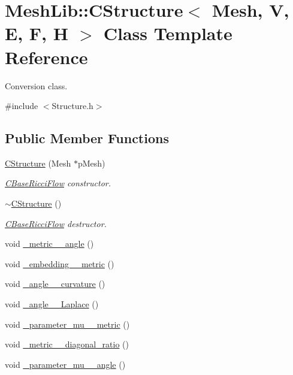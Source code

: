\hypertarget{class_mesh_lib_1_1_c_structure}{}\section{Mesh\+Lib\+:\+:C\+Structure$<$ Mesh, V, E, F, H $>$ Class Template Reference}
\label{class_mesh_lib_1_1_c_structure}


Conversion class.  




{\ttfamily \#include $<$Structure.\+h$>$}

\subsection*{Public Member Functions}
\begin{DoxyCompactItemize}
\item 
\hyperlink{class_mesh_lib_1_1_c_structure_a368f9061a7c92f3b85b9f59348b7f651}{C\+Structure} (Mesh $\ast$p\+Mesh)
\begin{DoxyCompactList}\small\item\em \hyperlink{class_mesh_lib_1_1_c_base_ricci_flow}{C\+Base\+Ricci\+Flow} constructor. \end{DoxyCompactList}\item 
\hyperlink{class_mesh_lib_1_1_c_structure_aef09abc61c919cf9c010497b6bad37cd}{$\sim$\+C\+Structure} ()
\begin{DoxyCompactList}\small\item\em \hyperlink{class_mesh_lib_1_1_c_base_ricci_flow}{C\+Base\+Ricci\+Flow} destructor. \end{DoxyCompactList}\item 
void \hyperlink{class_mesh_lib_1_1_c_structure_a9d4f67774556baf84aed076aab390ede}{\+\_\+metric\+\_\+\_\+angle} ()
\item 
void \hyperlink{class_mesh_lib_1_1_c_structure_a10e9ac6f3e546003459d310df209bdd4}{\+\_\+embedding\+\_\+\_\+metric} ()
\item 
void \hyperlink{class_mesh_lib_1_1_c_structure_aab9a90ee8e1f2a7b5bea24c0b070d239}{\+\_\+angle\+\_\+\_\+curvature} ()
\item 
void \hyperlink{class_mesh_lib_1_1_c_structure_a1583325c9a7640865d6fe55556c070f3}{\+\_\+angle\+\_\+\_\+\+Laplace} ()
\item 
void \hyperlink{class_mesh_lib_1_1_c_structure_a4855cc5a0ce8770288a38badca7c6b9d}{\+\_\+parameter\+\_\+mu\+\_\+\_\+metric} ()
\item 
void \hyperlink{class_mesh_lib_1_1_c_structure_aba95682430a57dab163cf54424ab05da}{\+\_\+metric\+\_\+\_\+diagonal\+\_\+ratio} ()
\item 
void \hyperlink{class_mesh_lib_1_1_c_structure_a5b329be24b5f12cc420fe9dd70270efc}{\+\_\+parameter\+\_\+mu\+\_\+\_\+angle} ()
\end{DoxyCompactItemize}
